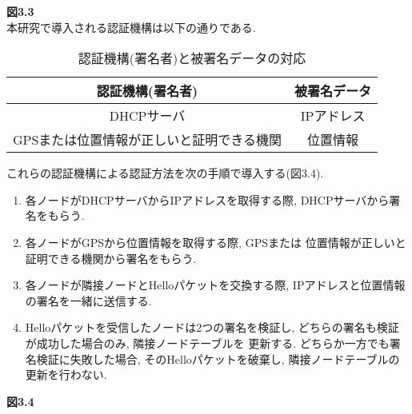 {\Large\textbf{図3.3}}\\ 

\indent 本研究で導入される認証機構は以下の通りである. \\
\setlength{\tabcolsep}{30pt}
\begin{longtable}{cc}
  \caption{認証機構(署名者)と被署名データの対応}
  \endfirsthead
  \hline
  \multicolumn{1}{c}{認証機構(署名者)} & \multicolumn{1}{c}{被署名データ} \\ \hline \hline
  DHCPサーバ & IPアドレス \\
  GPSまたは位置情報が正しいと証明できる機関 & 位置情報 \\ \hline
\end{longtable}

\indent これらの認証機構による認証方法を次の手順で導入する(図3.4).
\begin{enumerate}
  \item 各ノードがDHCPサーバからIPアドレスを取得する際, 
  DHCPサーバから署名をもらう.
  \item 各ノードがGPSから位置情報を取得する際, GPSまたは
  位置情報が正しいと証明できる機関から署名をもらう.
  \item 各ノードが隣接ノードとHelloパケットを交換する際, 
  IPアドレスと位置情報の署名を一緒に送信する. 
  \item Helloパケットを受信したノードは2つの署名を検証し, 
  どちらの署名も検証が成功した場合のみ, 隣接ノードテーブルを
  更新する. どちらか一方でも署名検証に失敗した場合, 
  そのHelloパケットを破棄し, 隣接ノードテーブルの更新を行わない.
\end{enumerate}

{\Large\textbf{図3.4}}\\



